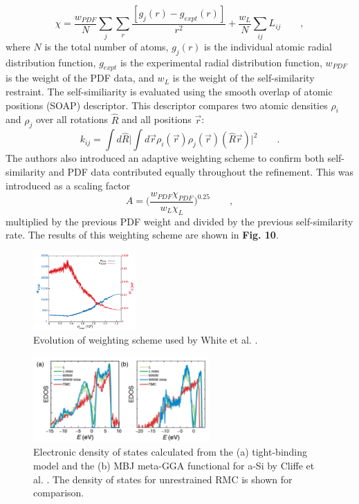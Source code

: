 \documentclass[3p,review,12pt]{elsarticle}
\begin{document}
\begin{equation}
\chi = \frac{w_{PDF}}{N}\sum_{j}\sum_{r} \frac{[g_{j}(r)-g_{expt}(r)]}{r^{2}}+\frac{w_{L}}{N}\sum_{ij}L_{ij} \qquad ,
\end{equation}
where $N$ is the total number of atoms, $g_{j}(r)$ is the individual atomic radial distribution function, $g_{expt}$ is the experimental radial distribution function, $w_{PDF}$ is the weight of the PDF data, and $w_{L}$ is the weight of the self-similarity restraint. The self-similiarity is evaluated using the smooth overlap of atomic positions (SOAP) descriptor. This descriptor compares two atomic densities $\rho_{i}$ and $\rho_{j}$ over all rotations $\hat{R}$ and all positions $\vec{r}$:
\begin{equation}
k_{ij} = \int d \hat{R} \Bigg|\int d\vec{r}\rho_{i}(\vec{r})\rho_{j}(\vec{r})(\hat{R}\vec{r})\Bigg|^{2} \qquad .
\end{equation}
The authors also introduced an adaptive weighting scheme to confirm both self-similarity and PDF data contributed equally throughout the refinement. This was introduced as a scaling factor
\begin{equation}
A=\bigg(\frac{w_{PDF}\chi_{PDF}}{w_{L}\chi_{L}}\bigg)^{0.25} \qquad ,
\end{equation}
multiplied by the previous PDF weight and divided by the previous self-similarity rate. The results of this weighting scheme are shown in \textbf{Fig. 10}. 

\begin{figure}[H]
	\includegraphics[width=0.35\textwidth]{white1}
	\centering
	\caption{Evolution of weighting scheme used by White et al. \cite{White2014}.}
\end{figure}

\begin{figure}[H]
	\includegraphics[width=0.6\textwidth]{white2}
	\centering
	\caption{Electronic density of states calculated from the (a) tight-binding model and the (b) MBJ meta-GGA functional for a-Si by Cliffe et al. \cite{Cliffe2017}. The density of states for unrestrained RMC is shown for comparison.}
\end{figure}
\end{document}
